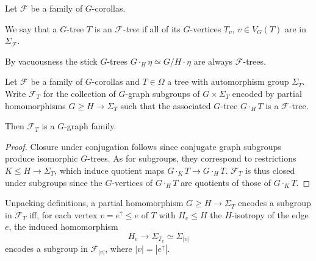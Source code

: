 \documentclass[a4paper,10pt]{article}%
\begin{document}
\begin{definition}\label{FTREE DEF}
Let $\mathcal{F}$ be a family of $G$-corollas.

We say that a $G$-tree $T$ is an \textit{$\mathcal{F}$-tree}
if all of its $G$-vertices $T_{v}$, $v \in V_G(T)$ are in 
$\Sigma_{\mathcal{F}}$.
\end{definition}


\begin{remark}\label{VACUOUSNESS REM}
	By vacuousness the stick $G$-trees
	$G \cdot_H \eta \simeq G/H \cdot \eta$ are always $\mathcal{F}$-trees.
\end{remark}


\begin{proposition}
Let $\mathcal{F}$ be a family of $G$-corollas and $T \in \Omega$ a tree with automorphism group $\Sigma_T$.
	Write $\mathcal{F}_T$ for the collection of $G$-graph subgroups of 
	$G \times \Sigma_T$ encoded by partial homomorphisms
	$G \geq H \to \Sigma_T$ such that the associated $G$-tree
	$G \cdot_H T$ is a $\mathcal{F}$-tree.
	
	Then $\mathcal{F}_T$ is a $G$-graph family.
\end{proposition}


\begin{proof}
	Closure under conjugation follows since conjugate graph subgroups produce isomorphic $G$-trees.
	As for subgroups, they correspond to restrictions $K \leq H \to \Sigma_T$,
	which induce quotient maps 
	$G \cdot_K T \to G \cdot_H T$. 
	$\mathcal{F}_T$ is thus closed under subgroups since the $G$-vertices of $ G \cdot_H T$ are quotients of those of $G \cdot_K T$.
\end{proof}


\begin{remark}\label{UNPACKFTYPE REM}
Unpacking definitions, a partial homomorphism 
$G \geq H \to \Sigma_T$
encodes a subgroup in $\mathcal{F}_T$
iff, for each vertex $v= e^{\uparrow} \leq e$ of $T$ with 
$H_e \leq H$ the
$H$-isotropy of the edge $e$, the induced homomorphism
\begin{equation}\label{PARTIALHOMEDGE EQ}
H_e \to \Sigma_{T_{v}} \simeq 
\Sigma_{|v|}
\end{equation}
encodes a subgroup in $\mathcal{F}_{|v|}$, where $|v|=|e^{\uparrow}|$.
\end{remark}
\end{document}

